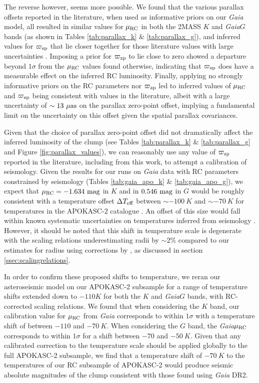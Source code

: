 \documentclass[fleqn,usenatbib]{mnras}
\newcommand{\oozp}{\mbox{$\varpi_{\rm zp}$}\xspace}
\newcommand{\murc}{\mbox{$\mu_{\rm RC}$}\xspace}
\newcommand{\teff}{\mbox{$T_{\rm eff}$}\xspace}
\newcommand{\gaia}{\emph{Gaia}\xspace}
\newcommand{\new}[1]{#1}
\begin{document}
The reverse however, seems more possible. We found that the various parallax offsets reported in the literature, when used as informative priors on our \gaia model, all resulted in similar values for \murc in both the 2MASS $K$ and \gaia $G$ bands (as shown in Tables \ref{tab:parallax_k} \& \ref{tab:parallax_g}), and inferred values for \oozp that lie closer together for those literature values with large uncertainties \citep{art:stassun+torres2018,art:riess+2018,art:sahlholdt+silvaaguirre2018}. Imposing a prior for \oozp to lie close to zero showed a departure beyond $1\sigma$ from the \murc values found otherwise, indicating that \oozp does have a measurable effect on the inferred RC luminosity. Finally, applying no strongly informative priors on the RC parameters nor \oozp led to inferred values of \murc and \oozp being consistent with values in the literature, albeit with a large uncertainty of $\sim 13\ \mu \rm as$ on the parallax zero-point offset, implying a fundamental limit on the uncertainty on this offset given the spatial parallax covariances.

Given that the choice of parallax zero-point offset did not dramatically affect the inferred luminosity of the clump \new{(see Tables \ref{tab:parallax_k} \& \ref{tab:parallax_g} and Figure \ref{fig:parallax_values})}, we can reasonably use any value of \oozp reported in the literature, including from this work, to attempt a calibration of seismology. Given the results for our runs on \gaia data with RC parameters constrained by seismology (Tables \ref{tab:gaia_apo_k} \& \ref{tab:gaia_apo_g}), we expect that $\murc = -1.634\ \rm mag$ in $K$ and in $0.546\ \rm mag$ in $G$ would be roughly consistent with a temperature offset $\Delta\teff$ between $\sim -100\ K$ and $\sim - 70\ K$ for temperatures in the APOKASC-2 catalogue \citep[(which, as has been noted, are already lower than those reported by][for the same stars]{art:mathur+2017}. An offset of this size would fall within known systematic uncertainties on temperatures inferred from seismology \citep{art:slumstrup+2018}. However, it should be noted that this shift in temperature scale is degenerate with the scaling relations underestimating radii by $\sim 2\%$ compared to our estimates for radius using corrections by \cite{art:sharma+stello2016}, as discussed in section \ref{ssec:scalingrelations}.

In order to confirm these proposed shifts to temperature, we reran our asteroseismic model on our APOKASC-2 subsample for a range of temperature shifts extended down to $-110 K$ for both the $K$ and \gaia $G$ bands, with RC-corrected scaling relations. We found that when considering the $K$ band, our calibration value for \murc from \gaia corresponds to within $1\sigma$ with a temperature shift of between $-110$ and $-70\ K$. When considering the $G$ band, the \gaia \murc corresponds to within $1\sigma$ for a shift between $-70$ and $-50\ K$. Given that any calibrated correction to the temperature scale should be applied globally to the full APOKASC-2 subsample, we find that a temperature shift of $-70\ K$ to the temperatures of our RC subsample of APOKASC-2 would produce seismic absolute magnitudes of the clump consistent with those found using \gaia DR2.
\end{document}
